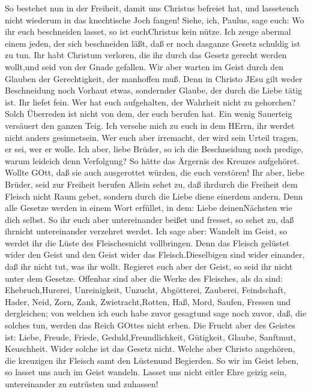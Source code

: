  So bestehet nun in der Freiheit, damit uns Christus
befreiet hat, und lasseteuch nicht wiederum in das knechtische Joch
fangen!  Siehe, ich, Paulus, sage euch: Wo ihr euch
beschneiden lasset, so ist euchChristus kein nütze.  Ich
zeuge abermal einem jeden, der sich beschneiden läßt, daß er noch
dasganze Gesetz schuldig ist zu tun.  Ihr habt Christum
verloren, die ihr durch das Gesetz gerecht werden wollt,und seid von der
Gnade gefallen.  Wir aber warten im Geist durch den Glauben
der Gerechtigkeit, der manhoffen muß.  Denn in Christo JEsu
gilt weder Beschneidung noch Vorhaut etwas, sondernder Glaube, der durch
die Liebe tätig ist.  Ihr liefet fein. Wer hat euch
aufgehalten, der Wahrheit nicht zu gehorchen?  Solch
Überreden ist nicht von dem, der euch berufen hat.  Ein
wenig Sauerteig versäuert den ganzen Teig.  Ich versehe
mich zu euch in dem HErrn, ihr werdet nicht anders gesinnetsein. Wer
euch aber irremacht, der wird sein Urteil tragen, er sei, wer er wolle.
 Ich aber, liebe Brüder, so ich die Beschneidung noch
predige, warum leideich denn Verfolgung? So hätte das Ärgernis des
Kreuzes aufgehöret.  Wollte GOtt, daß sie auch ausgerottet
würden, die euch verstören!  Ihr aber, liebe Brüder, seid
zur Freiheit berufen Allein sehet zu, daß ihrdurch die Freiheit dem
Fleisch nicht Raum gebet, sondern durch die Liebe diene einerdem andern.
 Denn alle Gesetze werden in einem Wort erfüllet, in dem:
Liebe deinenNächsten wie dich selbst.  So ihr euch aber
untereinander beißet und fresset, so sehet zu, daß ihrnicht
untereinander verzehret werdet.  Ich sage aber: Wandelt im
Geist, so werdet ihr die Lüste des Fleischesnicht vollbringen.
 Denn das Fleisch gelüstet wider den Geist und den Geist
wider das Fleisch.Dieselbigen sind wider einander, daß ihr nicht tut,
was ihr wollt.  Regieret euch aber der Geist, so seid ihr
nicht unter dem Gesetze.  Offenbar sind aber die Werke des
Fleisches, als da sind: Ehebruch,Hurerei, Unreinigkeit, Unzucht,
 Abgötterei, Zauberei, Feindschaft, Hader, Neid, Zorn,
Zank, Zwietracht,Rotten, Haß, Mord,  Saufen, Fressen und
dergleichen; von welchen ich euch habe zuvor gesagtund sage noch zuvor,
daß, die solches tun, werden das Reich GOttes nicht erben. 
Die Frucht aber des Geistes ist: Liebe, Freude, Friede,
Geduld,Freundlichkeit, Gütigkeit, Glaube, Sanftmut, Keuschheit.
 Wider solche ist das Gesetz nicht.  Welche
aber Christo angehören, die kreuzigen ihr Fleisch samt den Lüstenund
Begierden.  So wir im Geist leben, so lasset uns auch im
Geist wandeln.  Lasset uns nicht eitler Ehre geizig sein,
untereinander zu entrüsten und zuhassen!

